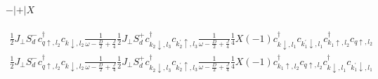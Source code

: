 \documentclass[12pt]{revtex4-2}
\begin{document}
\paragraph{\(-|+|X\)}
\begin{equation}\begin{aligned}
	\frac{1}{2}J_\perp S_d^- c^\dagger_{q \uparrow, l_2}c_{k \downarrow, l_2} \frac{1}{\omega - \frac{D}{2} + \frac{J}{4}}\frac{1}{2}J_\perp S_d^+ c^\dagger_{k_2 \downarrow, l_3}c_{k_2^\prime \uparrow, l_3} \frac{1}{\omega - \frac{D}{2} + \frac{J}{4}} \frac{1}{4}X \left( -1 \right) c^\dagger_{k \downarrow,l_1}c_{k_1^\prime\downarrow,l_1}c^\dagger_{k_1 \uparrow,l_2}c_{q \uparrow,l_2} 
\end{aligned}\end{equation}
\begin{equation}\begin{aligned}
	\frac{1}{2}J_\perp S_d^- c^\dagger_{q \uparrow, l_2}c_{k \downarrow, l_2} \frac{1}{\omega - \frac{D}{2} + \frac{J}{4}}\frac{1}{2}J_\perp S_d^+ c^\dagger_{k_2 \downarrow, l_3}c_{k_2^\prime \uparrow, l_3} \frac{1}{\omega - \frac{D}{2} + \frac{J}{4}} \frac{1}{4}X \left( -1 \right) c^\dagger_{k_1 \uparrow,l_2}c_{q \uparrow,l_2} c^\dagger_{k \downarrow,l_1}c_{k_1^\prime\downarrow,l_1} 
\end{aligned}\end{equation}
\end{document}
